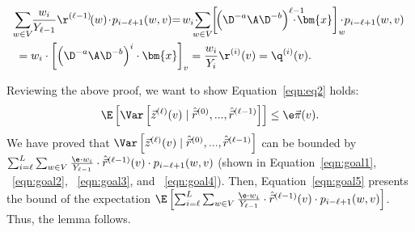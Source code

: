 \vspace{-2mm}
\begin{equation}\nonumber
\vspace{-1mm}
\begin{aligned}
&\hspace{-1.5mm}\sum_{w \in V}\hspace{-1mm}\frac{w_i}{Y_{\ell-1}}\r^{(\ell-1)}\hspace{-0.5mm}(w)\hspace{-0.5mm}\cdot \hspace{-0.5mm} p_{i-\ell+1}(w,v)\hspace{-1mm}=\hspace{-0.5mm}w_i\hspace{-0.5mm}\cdot \hspace{-2.5mm}\sum_{w \in V}\hspace{-1mm} \left[\hspace{-0.5mm}\left(\D^{-a} \A \D^{-b}\right)^{\ell-1}\hspace{-4.5mm}\cdot \hspace{-0.5mm} \bm{x}\right]_w \hspace{-2mm}\hspace{-0.5mm}\cdot \hspace{-0.5mm} p_{i-\ell+1}(w,v)\\
&=w_i\cdot \left[\left(\D^{-a} \A \D^{-b}\right)^{i}\cdot \bm{x}\right]_v=\frac{w_i}{Y_i}\r^{(i)}(v)=\q^{(i)}(v). 
\end{aligned}
\end{equation}

Reviewing the above proof, we want to show Equation~\eqref{eqn:eq2} holds: 
\vspace{-2mm}
\begin{equation}\nonumber
\vspace{-2mm}
\E \left[\Var \left[\vec{z}^{(\ell)}(v)\mid \hat{\vec{r}}^{(0)},...,\hat{\vec{r}}^{(\ell-1)}\right]\right]\le \e \vec{\pi}(v). 
\end{equation}
We have proved that $\Var \left[\vec{z}^{(\ell)}(v)\mid \hat{\vec{r}}^{(0)},...,\hat{\vec{r}}^{(\ell-1)}\right]$ can be bounded by $\sum_{i=\ell}^{L}\sum_{w \in V} \frac{\e\cdot w_i}{Y_{\ell-1}}\cdot \hat{\vec{r}}^{(\ell-1)}(v)\cdot p_{i-\ell+1}(w,v)$ (shown in Equation~\eqref{eqn:goal1}, \\~\eqref{eqn:goal2}, ~\eqref{eqn:goal3}, and ~\eqref{eqn:goal4}). Then, Equation~\eqref{eqn:goal5} presents the bound of the expectation $\E \left[\sum_{i=\ell}^{L}\sum_{w \in V} \frac{\e\cdot w_i}{Y_{\ell-1}}\cdot \hat{\vec{r}}^{(\ell-1)}(v)\cdot p_{i-\ell+1}(w,v)\right]$. Thus, the lemma follows. 


